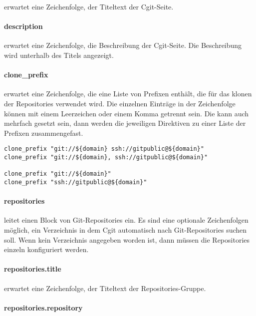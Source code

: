  erwartet eine Zeichenfolge, der Titeltext der Cgit-Seite.

\paragraph{description}

 erwartet eine Zeichenfolge, die Beschreibung der
Cgit-Seite. Die Beschreibung wird unterhalb des Titels angezeigt.

\paragraph{clone\_prefix}

 erwartet eine Zeichenfolge, die eine Liste von
Prefixen enthält, die für das klonen der Repositories verwendet wird. Die
einzelnen Einträge in der Zeichenfolge können mit einem Leerzeichen oder einem
Komma getrennt sein. Die  kann auch mehrfach gesetzt
sein, dann werden die jeweiligen Direktiven zu einer Liste der Prefixen
zusammengefast.

\begin{lstlisting}[style=Java, caption=Beispiele für die
\directive{clone\_prefix}]
clone_prefix "git://${domain} ssh://gitpublic@${domain}"
clone_prefix "git://${domain}, ssh://gitpublic@${domain}"

clone_prefix "git://${domain}"
clone_prefix "ssh://gitpublic@${domain}"
\end{lstlisting}

\paragraph{repositories}

 leitet einen Block von Git-Repositories ein. Es sind
eine optionale Zeichenfolgen möglich, ein Verzeichnis in dem Cgit automatisch
nach Git-Repositories suchen soll. Wenn kein Verzeichnis angegeben worden ist,
dann müssen die Repositories einzeln konfiguriert werden.

\paragraph{repositories.title}

 erwartet eine Zeichenfolge, der Titeltext der
Repositories-Gruppe.

\paragraph{repositories.repository}

